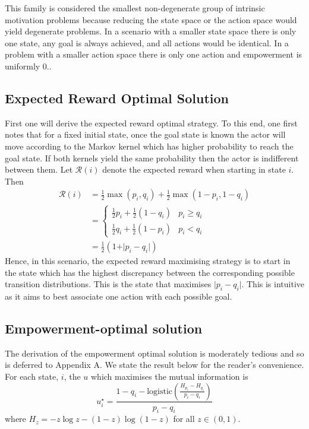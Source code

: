 \documentclass{article}
\newcommand{\Rr}{\mathcal{R}}
\begin{document}
This family is considered the smallest non-degenerate group of intrinsic motivation problems because reducing the state space or the action space would yield degenerate problems. In a scenario with a smaller state space there is only one state, any goal is always achieved, and all actions would be identical. In a problem with a smaller action space there is only one action and empowerment is uniformly $0$.. 

\subsection{Expected Reward Optimal Solution}
First one will derive the expected reward optimal strategy. To this end, one first notes that for a fixed initial state, once the goal state is known the actor will move according to the Markov kernel which has higher probability to reach the goal state. If both kernels yield the same probability then the actor is indifferent between them. Let $\Rr(i)$ denote the expected reward when starting in state $i$. Then
\begin{align*}
\Rr(i) 
	&= \frac{1}{2} \max(p_i,q_i) +\frac{1}{2} \max(1-p_i,1-q_i)\\
	&=\begin{cases}
		\frac{1}{2} p_i +\frac{1}{2} (1-q_i) & p_i\geq q_i\\
		\frac{1}{2} q_i +\frac{1}{2} (1-p_i) & p_i < q_i
		\end{cases}\\
	&=\frac{1}{2}(1+\vert p_i - q_i \vert) 	
\end{align*}
Hence, in this scenario, the expected reward maximising strategy is to start in the state which has the highest discrepancy between the corresponding possible transition distributions. This is the state that maximises $\vert p_i-q_i\vert$. This is intuitive as it aims to best associate one action with  each possible goal. 

\subsection{Empowerment-optimal solution}
The derivation of the empowerment optimal solution is moderately tedious and so is deferred to Appendix A. We state the result below for the reader's convenience. For each state, $i$, the $u$ which maximises the mutual information is 
\[u^\star_i=\frac{1-q_i-\text{logistic}\left(\frac{H_{p_i}-H_{q_i}}{p_i-q_i}\right)}{p_i-q_i} \]
where $H_z=-z\log z - (1-z)\log(1-z)$ for all $z\in (0,1)$. 
\end{document}
